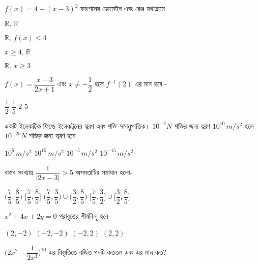 \documentclass[addpoints]{exam}
\begin{document}
\begin{questions}

 \question  $ f(x)= 4-(x-3)^2 $ ফাংশনের ডোমেইন এবং রেঞ্জ যথাক্রমে

\begin{oneparchoices}
\choice $ \mathbb{R},\,\mathbb{R} $

\choice $ \mathbb{R},\,f(x)\le 4 $

\choice $ x \ge 4,\, \mathbb{R}  $

\choice $ \mathbb{R},\, x\ge 3  $

\end{oneparchoices}

\question  $ f(x) = \dfrac{x-3}{2x+1} $ এবং $ x \neq - \dfrac{1}{2} $ হলে $ f^{-1}(2) $ এর মান হবে -

\begin{oneparchoices}
\choice $ \dfrac{1}{2}$
\choice $ \dfrac{1}{5}$
\choice $ 2 $
\choice $ 5 $
\end{oneparchoices}


\question একটি ইলেকট্রিক ফিল্ডে ইলেকট্রনের ত্বরণ এবং শক্তি সমানুপাতিক। $ 10^{-2} N $ শক্তির জন্য ত্বরণ $ 10^{10}\, m/s^{2} $ হলে $ 10^{-25} N $ শক্তির জন্য ত্বরণ হবে

\begin{oneparchoices}
\choice $ 10^{5}\, m/s^{2} $
\choice $ 10^{15}\, m/s^{2} $
\choice $ 10^{-5}\, m/s^{2} $
\choice $ 10^{-15}\, m/s^{2} $

\end{oneparchoices}

\question   বাস্তব সংখ্যায় $ \dfrac{1}{|2x-3|}> 5 $ অসমতাটির সমাধান হলো-

\begin{oneparchoices}
\choice $ \Big(\dfrac{7}{5}, \dfrac{8}{5}\Big)$
\choice $ \Big[\dfrac{7}{5}, \dfrac{8}{5}\Big]$
\choice $ \Big(\dfrac{7}{5}, \dfrac{3}{5}\Big)\cup \Big(\dfrac{3}{2}, \dfrac{8}{5}\Big)  $
\choice $ \Big[\dfrac{7}{5}, \dfrac{3}{2}\Big]\cup \Big[\dfrac{3}{2}, \dfrac{8}{5}\Big]  $
\end{oneparchoices}

\question  $ x^{2}+4x+2y=0 $ পরাবৃত্তের শীর্ষবিন্দু হবে- 

\begin{oneparchoices}
\choice $ (2,-2) $
\choice $ (-2,-2) $
\choice $ (-2, 2) $
\choice $ (2, 2) $

\end{oneparchoices}

\question $ \Big(2x^{2}-\dfrac{1}{2x^{3}}\Big)^{10} $ এর বিস্তৃতিতে বর্জিত পদটি কততম এবং এর মান কত?


\end{questions}
\end{document}
